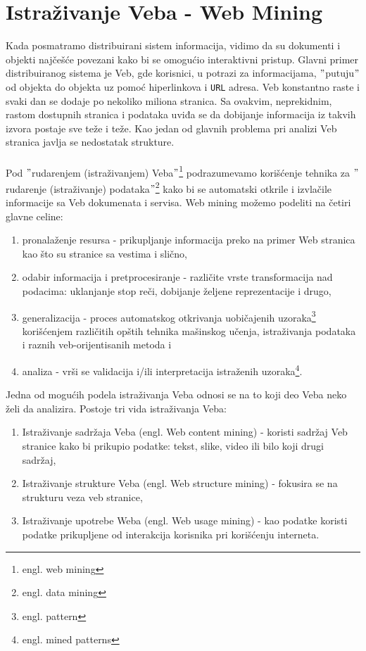 \documentclass[a4paper]{article}
\begin{document}
\section{Istraživanje Veba - Web Mining}
\label{sec:veb}
Kada posmatramo distribuirani sistem informacija, vidimo da su dokumenti i objekti najčešće povezani kako bi se omogućio interaktivni pristup. Glavni primer distribuiranog sistema je Veb, gde korisnici, u potrazi za informacijama, $"$putuju$"$ od objekta do objekta uz pomoć hiperlinkova i \texttt{URL} adresa. Veb konstantno raste i svaki dan se dodaje po nekoliko miliona stranica. Sa ovakvim, neprekidnim, rastom dostupnih stranica i podataka uviđa se da dobijanje informacija iz takvih izvora postaje sve teže i teže. Kao jedan od glavnih problema pri analizi Veb stranica javlja se nedostatak strukture.\\\\Pod $"$rudarenjem (istraživanjem) Veba$"$\footnote{engl. web mining} podrazumevamo korišćenje tehnika za $"$rudarenje (istraživanje) podataka$"$\footnote{engl. data mining} kako bi se automatski otkrile i izvlačile informacije sa Veb dokumenata i servisa. Web mining možemo podeliti na četiri glavne celine:
\begin{enumerate}
\item pronalaženje resursa - prikupljanje informacija preko na primer Web stranica kao što su stranice sa vestima i slično,
\item odabir informacija i pretprocesiranje - različite vrste transformacija nad podacima: uklanjanje stop reči, dobijanje željene reprezentacije i drugo,
\item generalizacija - proces automatskog otkrivanja uobičajenih uzoraka\footnote{engl. pattern} korišćenjem različitih opštih tehnika mašinskog učenja, istraživanja podataka i raznih veb-orijentisanih metoda i  
\item analiza - vrši se validacija i/ili interpretacija istraženih uzoraka\footnote{engl.  mined patterns}. 
\end{enumerate}
Jedna od mogućih podela istraživanja Veba odnosi se na to koji deo Veba neko želi da analizira. Postoje tri vida istraživanja Veba:
\begin{enumerate}
\item Istraživanje sadržaja Veba (engl. Web content mining) - koristi sadržaj Veb stranice kako bi prikupio podatke: tekst, slike, video ili bilo koji drugi sadržaj,
\item Istraživanje strukture Veba (engl. Web structure mining) - fokusira se na strukturu veza veb stranice,
\item Istraživanje upotrebe Weba (engl. Web usage mining) - kao podatke koristi podatke prikupljene od interakcija korisnika pri korišćenju interneta.
\end{enumerate}
\end{document}
